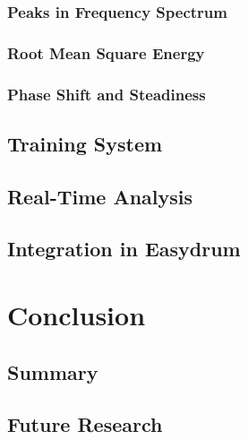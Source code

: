 \subsubsection{Peaks in Frequency Spectrum}
\subsubsection{Root Mean Square Energy}
\subsubsection{Phase Shift and Steadiness}

\subsection{Training System}

\subsection{Real-Time Analysis}

\subsection{Integration in Easydrum}

\section{Conclusion}
\subsection{Summary}
\subsection{Future Research}